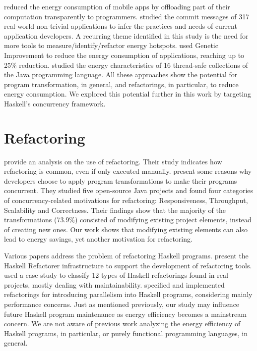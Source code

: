  reduced the energy consumption of mobile apps by offloading part of their computation transparently to programmers.  studied the commit messages of 317 real-world non-trivial applications to infer the practices and needs of current application developers. A recurring theme identified in this study is the need for more tools to measure/identify/refactor energy hotspots.  used Genetic Improvement to reduce the energy consumption of applications, reaching up to 25\% reduction.  studied the energy characteristics of 16 thread-safe collections of the Java programming language. All these approaches show the potential for program transformation, in general, and refactorings, in particular, to reduce energy consumption. We explored this potential further in this work by targeting Haskell's concurrency framework.


\section{Refactoring}
 provide an analysis on the use of refactoring. Their study indicates how refactoring is common, even if only executed manually.  present some reasons why developers choose to apply program transformations to make their programs concurrent. They studied five open-source Java projects and found four categories of concurrency-related motivations for refactoring: Responsiveness, Throughput, Scalability and Correctness. Their findings show that the majority of the transformations (73.9\%) consisted of modifying existing project elements, instead of creating new ones. Our work shows that modifying existing elements can also lead to energy savings, yet another motivation for refactoring.

Various papers address the problem of refactoring Haskell programs.  present the Haskell Refactorer infrastructure to support the development of refactoring tools.  used a case study to classify 12 types of Haskell refactorings found in real projects, mostly dealing with maintainability.  specified and implemented refactorings for introducing parallelism into Haskell programs, considering mainly performance concerns. Just as mentioned previously, our study may influence future Haskell program maintenance as energy efficiency becomes a mainstream concern. We are not aware of previous work analyzing the energy efficiency of Haskell programs, in particular, or purely functional programming languages, in general.
